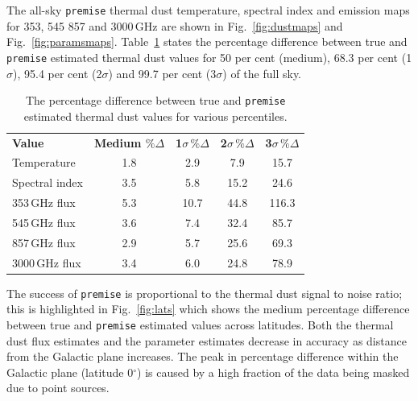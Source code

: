 \documentclass[a4paper,fleqn,usenatbib]{mnras}
\begin{document}
The all-sky {\texttt{premise}} thermal dust temperature, spectral index and emission maps for 353, 545 857 and 3000\,GHz are shown in Fig.~\ref{fig:dustmaps} and Fig.~\ref{fig:paramsmaps}. Table~\ref{tab:accstats} states the percentage difference between true and {\texttt{premise}} estimated thermal dust values for 50 per cent (medium), 68.3 per cent (1$\sigma$), 95.4 per cent (2$\sigma$) and 99.7 per cent (3$\sigma$) of the full sky.

\begin{table}
 \caption{The percentage difference between true and {\texttt{premise}} estimated thermal dust values for various percentiles.}
 \label{tab:accstats}
 \begin{tabular}{l| c| c| c| c}
\hline
{\bf{Value}} &{\bf{ Medium $\% \Delta$}}  & {\bf{1$ \sigma \, \% \Delta$}}  & {\bf{2$ \sigma \, \% \Delta$}}  & {\bf{3$ \sigma \, \% \Delta$}}  \\ 
Temperature & 1.8 & 2.9 & 7.9 & 15.7 \\
Spectral index & 3.5 & 5.8 & 15.2 & 24.6 \\
353\,GHz flux & 5.3 & 10.7 & 44.8 & 116.3 \\
545\,GHz flux & 3.6 & 7.4 & 32.4 & 85.7 \\
857\,GHz flux & 2.9 & 5.7 & 25.6 & 69.3 \\
3000\,GHz flux & 3.4 & 6.0 & 24.8 & 78.9 \\
  \hline
 \end{tabular}
\end{table}

The success of {\texttt{premise}} is proportional to the thermal dust signal to noise ratio; this is highlighted in Fig.~\ref{fig:lats} which shows the medium percentage difference between true and {\texttt{premise}} estimated values across latitudes. Both the thermal dust flux estimates and the parameter estimates decrease in accuracy as distance from the Galactic plane increases. The peak in percentage difference within the Galactic plane (latitude 0$^{\circ}$) is caused by a high fraction of the data being masked due to point sources. 
\end{document}
